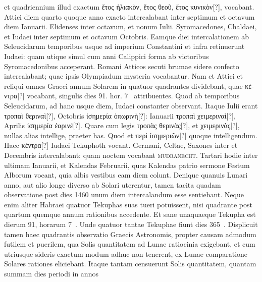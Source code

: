 et quadriennium illud exactum \textgreek{ἔτος ἡλιακὸν, ἔτος θεοῦ, ἔτος
κυνικὸν[?]}, vocabant.
Attici diem quarto quoque anno exacto intercalabant
inter septimum et octavum diem Ianuarii.
Elidenses inter
octavum, et nonum Iulii.
Syromacedones, Chaldaei, et Iudaei inter
septimum et octavum Octobris.
Eamque diei intercalationem ab Seleucidarum
temporibus usque ad imperium Constantini et infra retinuerunt
Iudaei: quam utique simul cum anni Calippici forma ab victoribus
Syromacedonibus acceperant.
Romani Atticos secuti brumae
sidere confecto intercalabant; quae ipsis Olympiadum mysteria vocabantur.
Nam et Attici et reliqui omnes Graeci annum Solarem in
quatuor quadrantes dividebant, quae \textgreek{κέντρα[?]}
 vocabant, singulis dies 91.
hor. 7~ attribuentes.
Quod ab temporibus Seleucidarum, ad hanc usque
diem, Iudaei constanter observant.
Itaque  Iulii erant \textgreek{τροπαὶ θεριναὶ[?]},
 Octobris \textgreek{ἰσημερία ὀπωρινὴ[?]}:
  Ianuarii \textgreek{τροπαὶ χειμεριναὶ[?]}, 
Aprilis \textgreek{ἰσημερία ἐαρινέ[?]}.
Quare cum legis \textgreek{τροπὰς θερινὰς[?]},
 et \textgreek{χειμερινὰς[?]},
nullas alias intellige, praeter has.
Quod et \textgreek{περὶ ἰσημεριῶν[?]} quoque intelligendum.
Haec \textgreek{κέντρα[?]} Iudaei Tekuphoth vocant.
Germani, Celtae,
Saxones inter  et  Decembris intercalabant:
 quam noctem
vocabant \textsc{mudranecht}.
Tartari hodie inter ultimam Ianuarii,
et Kalendas Februarii, quas Kalendas patrio sermone Festum Alborum
vocant, quia albis vestibus eam diem colunt.
Denique quanuis
Lunari anno, aut alio longe diverso ab Solari uterentur, tamen tacita
quadam observatione post dies 1460 unum diem intercalandum esse
sentiebant.
Neque enim aliter Habraei quatuor Tekuphas suas tueri
potuissent, nisi quadrante post quartum quemque annum rationibus accedente.
Et sane unaquaeque Tekupha est dierum 91, horarum 7~.
Unde
quatuor tantae Tekuphae fiunt dies 365~.
Displicuit tamen haec quadrantis
observatio Graecis Astronomis, propter causam admodum futilem
et puerilem, qua Solis quantitatem ad Lunae ratiocinia exigebant,
et cum utriusque sideris exactum modum adhuc non tenerent,
ex Lunae comparatione Solares rationes eliciebant.
%
Itaque tantam
censuerunt Solis quantitatem, quantam summam dies periodi in annos
